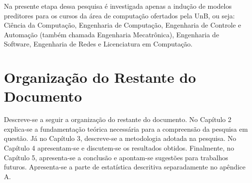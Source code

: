 Na presente etapa dessa pesquisa é investigada apenas a indução de modelos preditores
para os cursos da área de computação ofertados pela UnB, ou seja: Ciência da
Computação, Engenharia de Computação, Engenharia de Controle e Automação (também
chamada Engenharia Mecatrônica), Engenharia de Software, Engenharia de Redes e
Licenciatura em Computação. 

\section{Organização do Restante do Documento}
\par Descreve-se a seguir a organização do restante do documento. 
No Capítulo 2 explica-se a fundamentação teórica necessária para a compreensão da
pesquisa em questão. Já no Capítulo 3, descreve-se a metodologia
adotada na pesquisa. No Capítulo 4 apresentam-se e discutem-se os resultados
obtidos. Finalmente, no Capítulo 5, apresenta-se a conclusão e apontam-se sugestões para
trabalhos futuros. Apresenta-se a parte de estatística descritiva separadamente no
apêndice A. 
